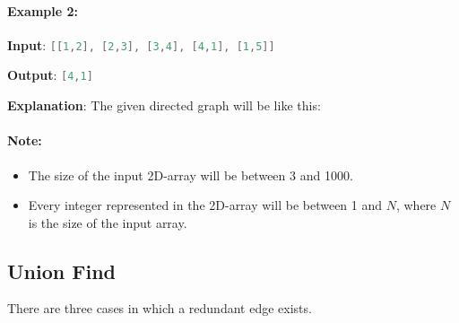 \paragraph{Example 2:}
\begin{flushleft}


\textbf{Input}: \lstinline[language=C++, basicstyle=\small\ttfamily, keywordstyle=\bfseries\color{green!40!black}]|[[1,2], [2,3], [3,4], [4,1], [1,5]]|

\textbf{Output}: \lstinline[language=C++, basicstyle=\small\ttfamily, keywordstyle=\bfseries\color{green!40!black}]|[4,1]|

\textbf{Explanation}: The given directed graph will be like this:
\begin{figure}[H]
\end{figure}
\end{flushleft}
\paragraph{Note:}

\begin{itemize}
\item The size of the input 2D-array will be between 3 and 1000.
\item Every integer represented in the 2D-array will be between 1 and $ N $, where $ N $ is the size of the input array.
\end{itemize}

\subsection{Union Find}
There are three cases in which a redundant edge exists.

